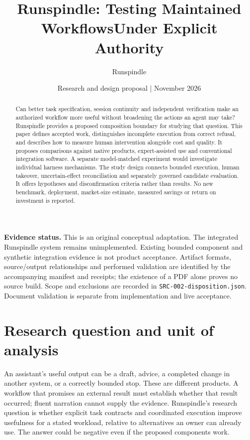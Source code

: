\documentclass[11pt,letterpaper]{article}
\title{Runspindle: Testing Maintained Workflows\newline Under Explicit Authority}
\author{Runspindle}
\date{Research and design proposal | November 2026}
\begin{document}
\maketitle
\begin{abstract}
Can better task specification, session continuity and independent verification
make an authorized workflow more useful without broadening the actions an agent
may take? Runspindle provides a proposed composition boundary for studying that
question. This paper defines accepted work, distinguishes incomplete execution
from correct refusal, and describes how to measure human intervention alongside
cost and quality. It proposes comparisons against native products, expert-assisted
use and conventional integration software. A separate model-matched experiment
would investigate individual harness mechanisms. The study design connects bounded
execution, human takeover, uncertain-effect reconciliation and separately governed
candidate evaluation. It offers hypotheses and disconfirmation criteria rather
than results. No new benchmark, deployment, market-size estimate, measured savings
or return on investment is reported.
\end{abstract}

\textbf{Evidence status.} This is an original conceptual adaptation. The integrated
Runspindle system remains unimplemented. Existing bounded component and synthetic
integration evidence is not product acceptance. Artifact formats, source/output
relationships and performed validation are identified by the accompanying
manifest and receipts; the existence of a PDF alone proves no source build.
Scope and exclusions are recorded in \texttt{SRC-002-disposition.json}.
Document validation is separate from implementation and live acceptance.

\section{Research question and unit of analysis}
\label{sec:thesis}
An assistant's useful output can be a draft, advice, a completed change in another
system, or a correctly bounded stop. These are different products. A workflow
that promises an external result must establish whether that result occurred;
fluent narration cannot supply the evidence. Runspindle's research question is
whether explicit task contracts and coordinated execution improve usefulness for
a stated workload, relative to alternatives an owner can already use. The answer
could be negative even if the proposed components work.
\end{document}
